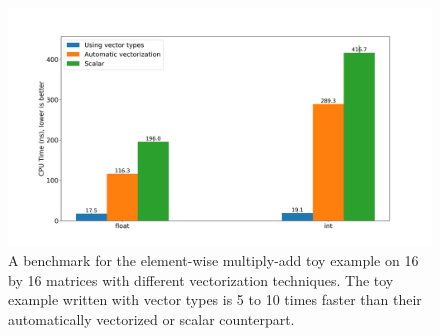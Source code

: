 \documentclass[logo,bsc,singlespacing,parskip]{infthesis}
\newcommand{\dtint}{\texttt{int32\char`_t}}
\newcommand{\dtfloat}{\texttt{float}}
\begin{document}
\begin{figure}[H]%
    \begin{center}
    \includegraphics[width=\linewidth]{image/plot_vectorization_method.png}
    \end{center}
    \caption{A benchmark for the element-wise multiply-add toy example on 16
        by 16 matrices with different vectorization techniques. The toy example
        written with vector types is 5 to 10 times faster than their
        automatically vectorized or scalar counterpart. 
    }
    \label{plot_vectorization_method}
\end{figure}
\end{document}
